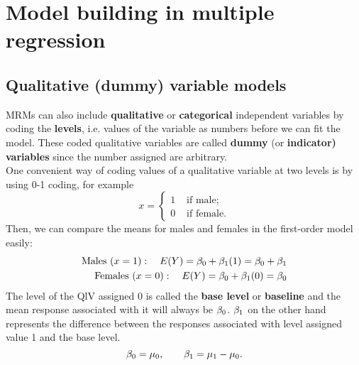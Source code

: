 \documentclass{report}
\begin{document}
	\section{Model building in multiple regression}

	\subsection{Qualitative (dummy) variable models}
	MRMs can also include \textbf{qualitative} or \textbf{categorical} independent variables by coding the \textbf{levels}, i.e. values of the variable as numbers before we can fit the model. These coded qualitative variables are called \textbf{dummy} (or \textbf{indicator) variables} since the number assigned are arbitrary.\\
	
	One convenient way of coding values of a qualitative variable at two levels is by using 0-1 coding, for example
	$$x=\begin{cases}
		1 & \text{ if male;}\\
		0 & \text{ if female.}
	\end{cases}$$
	Then, we can compare the means for males and females in the first-order model easily:
	\begin{align*}
		\text{Males }(x=1):\quad E(Y)=\beta_0+\beta_1(1)=\beta_0+\beta_1\\
		\text{Females }(x=0):\quad E(Y)=\beta_0+\beta_1(0)=\beta_0\\
	\end{align*}
	The level of the QlV assigned 0 is called the \textbf{base level} or \textbf{baseline} and the mean response associated with it will always be $\beta_0$. $\beta_1$ on the other hand represents the difference between the responses associated with level assigned value 1 and the base level. 
	$$\beta_0=\mu_0, \quad\quad \beta_1=\mu_1-\mu_0.$$
	
\end{document}

